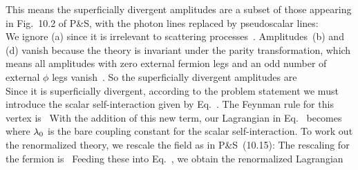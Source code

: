 \documentclass[11pt]{article}
\begin{document}
{	This means the superficially divergent amplitudes are a subset of those appearing in Fig.~10.2 of P\&S, with the photon lines replaced by pseudoscalar lines: \\[-4ex]
	We ignore (a) since it is irrelevant to scattering processes~\cite[pp.~317--318]{Peskin}.  Amplitudes~(b) and (d) vanish because the theory is invariant under the parity transformation, which means all amplitudes with zero external fermion legs and an odd number of external $\phi$ legs vanish~\cite[pp.~318, 323--324]{Peskin}.  So the superficially divergent amplitudes are \\[-3ex]
	  Since it is superficially divergent, according to the problem statement  we must introduce the scalar self-interaction given by Eq.~.  The Feynman rule for this vertex is~\cite[p.~325]{Peskin}
	With the addition of this new term, our Lagrangian in Eq.~ becomes
	where $\lambda_0$ is the bare coupling constant for the scalar self-interaction.  To work out the renormalized theory, we rescale the field as in P\&S~(10.15):
	The rescaling for the fermion is~\cite[p.~330]{Peskin}
	Feeding these into Eq.~, we obtain the renormalized Lagrangian~\cite[p.~324]{Peskin}
	}
\end{document}
